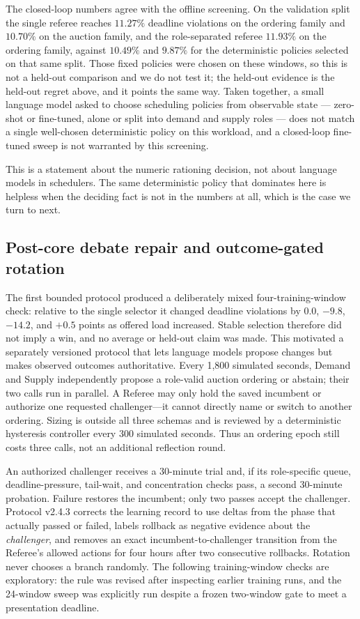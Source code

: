 \documentclass[conference]{IEEEtran}
\begin{document}
The closed-loop numbers agree with the offline screening.  On the validation split the single referee
reaches $11.27\%$ deadline violations on the ordering family and $10.70\%$ on the auction family, and
the role-separated referee $11.93\%$ on the ordering family, against $10.49\%$ and $9.87\%$ for the
deterministic policies selected on that same split.  Those fixed policies were chosen on these
windows, so this is not a held-out comparison and we do not test it; the held-out evidence is
the held-out regret above, and it points the same way.  Taken together, a small language model
asked to choose scheduling policies from observable state --- zero-shot or fine-tuned, alone or split
into demand and supply roles --- does not match a single well-chosen deterministic policy on this
workload, and a closed-loop fine-tuned sweep is not warranted by this screening.

This is a statement about the numeric rationing decision, not about language models in schedulers.
The same deterministic policy that dominates here is helpless when the deciding fact is not in the
numbers at all, which is the case we turn to next.

\subsection{Post-core debate repair and outcome-gated rotation}
\label{sec:bounded-pilot}
\label{sec:rotation}

The first bounded protocol produced a deliberately mixed four-training-window check: relative to the
single selector it changed deadline violations by $0.0$, $-9.8$, $-14.2$, and $+0.5$ points as offered
load increased. Stable selection therefore did not imply a win, and no average or held-out claim was
made. This motivated a separately versioned protocol that lets language
models propose changes but makes observed outcomes authoritative. Every 1,800 simulated seconds,
Demand and Supply independently propose a role-valid auction ordering or abstain; their two calls run
in parallel. A Referee may only hold the saved incumbent or authorize one requested challenger---it
cannot directly name or switch to another ordering. Sizing is outside all three schemas and is reviewed
by a deterministic hysteresis controller every 300 simulated seconds. Thus an ordering epoch still
costs three calls, not an additional reflection round.

An authorized challenger receives a 30-minute trial and, if its role-specific queue, deadline-pressure,
tail-wait, and concentration checks pass, a second 30-minute probation. Failure restores the incumbent;
only two passes accept the challenger. Protocol v2.4.3 corrects the learning record to use deltas from
the phase that actually passed or failed, labels rollback as negative evidence about the
\emph{challenger}, and removes an exact incumbent-to-challenger transition from the Referee's allowed
actions for four hours after two consecutive rollbacks. Rotation never chooses a branch randomly.
The following training-window checks are exploratory: the rule was revised after inspecting earlier
training runs, and the 24-window sweep was explicitly run despite a frozen two-window gate to meet a
presentation deadline.
\end{document}
